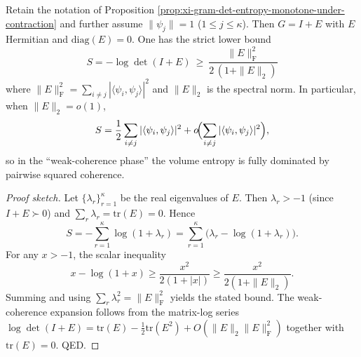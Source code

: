 \begin{proposition}\label{prop:xi-gram-entropy-lower-bound-by-coherence}
Retain the notation of Proposition \ref{prop:xi-gram-det-entropy-monotone-under-contraction} and further assume \(\|\psi_j\|=1\) (\(1\le j\le\kappa\)).
Then \(G=I+E\) with \(E\) Hermitian and \(\mathrm{diag}(E)=0\).
One has the strict lower bound
\[
\boxed{\;
S=-\log\det(I+E)\ \ge\ \frac{\|E\|_{\mathrm F}^{2}}{2\,(1+\|E\|_{2})}\;}
\]
where \(\|E\|_{\mathrm F}^{2}=\sum_{i\neq j}|\langle\psi_i,\psi_j\rangle|^2\) and \(\|E\|_2\) is the spectral norm.
In particular, when \(\|E\|_2=o(1)\),
\[
S=\frac12\sum_{i\neq j}|\langle\psi_i,\psi_j\rangle|^2+o\!\Bigl(\sum_{i\neq j}|\langle\psi_i,\psi_j\rangle|^2\Bigr),
\]
so in the ``weak-coherence phase'' the volume entropy is fully dominated by pairwise squared coherence.
\end{proposition}
\begin{proof}[Proof sketch]
Let \(\{\lambda_r\}_{r=1}^\kappa\) be the real eigenvalues of \(E\). Then \(\lambda_r>-1\) (since \(I+E\succ0\)) and \(\sum_r\lambda_r=\mathrm{tr}(E)=0\).
Hence
\[
S=-\sum_{r=1}^\kappa\log(1+\lambda_r)=\sum_{r=1}^\kappa\bigl(\lambda_r-\log(1+\lambda_r)\bigr).
\]
For any \(x>-1\), the scalar inequality
\[
x-\log(1+x)\ge \frac{x^2}{2(1+|x|)}\ge \frac{x^2}{2(1+\|E\|_2)}.
\]
Summing and using \(\sum_r\lambda_r^2=\|E\|_{\mathrm F}^2\) yields the stated bound.
The weak-coherence expansion follows from the matrix-log series
\(
\log\det(I+E)=\mathrm{tr}(E)-\frac12\mathrm{tr}(E^2)+O(\|E\|_2\|E\|_{\mathrm F}^2)
\)
together with \(\mathrm{tr}(E)=0\). QED.
\end{proof}

